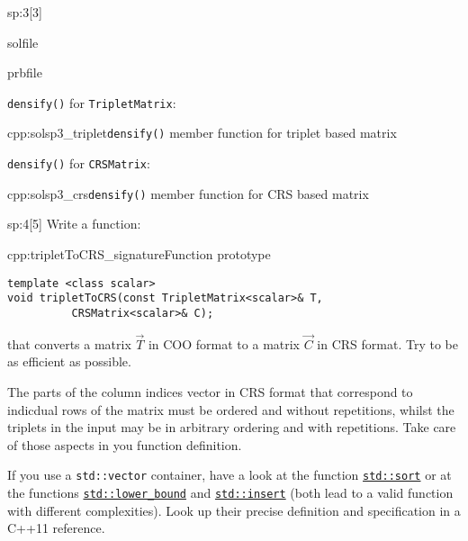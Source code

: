 \begin{samproblem}
\begin{subproblem}{sp:3}[3]
  \begin{samwriteprbpart}{solfile}
    \begin{writeverbatim}{prbfile}
      \begin{samsolution}
			\texttt{densify()} for \texttt{TripletMatrix}:
			\begin{samcode}[C++-code]{cpp:solsp3_triplet}{\texttt{densify()} member function for triplet based matrix}
			\end{samcode}
			\texttt{densify()} for \texttt{CRSMatrix}:
			\begin{samcode}[C++-code]{cpp:solsp3_crs}{\texttt{densify()} member function for CRS based matrix}
			\end{samcode}
      \end{samsolution}
    \end{writeverbatim}
  \end{samwriteprbpart}

\end{subproblem}

\begin{subproblem}{sp:4}[5]
  Write a function:
	\begin{samcode}[C++-code]{cpp:tripletToCRS_signature}{Function prototype}
		\begin{lstlisting}[style=cpp]
template <class scalar>
void tripletToCRS(const TripletMatrix<scalar>& T,
		  CRSMatrix<scalar>& C);
		\end{lstlisting}
	\end{samcode}
  that converts a matrix $\vec{T}$ in COO format to a matrix $\vec{C}$ in CRS format. 
	Try to be as efficient as possible.
  
  \begin{samhint}
    The parts of the column indices vector in CRS format that correspond to
    indicdual rows of the matrix must be ordered and without repetitions, whilst
    the triplets in the input may be in arbitrary ordering and with
    repetitions. Take care of those aspects in you function definition.
  \end{samhint}
  
  \begin{samhint}
    If you use a \verb|std::vector| container, have a look at the function
    \href{http://www.cplusplus.com/reference/algorithm/sort/}{\texttt{std::sort}}
    or at the functions
    \href{http://www.cplusplus.com/reference/algorithm/lower_bound/}{\texttt{std::lower\_bound}}
    and
    \href{http://www.cplusplus.com/reference/vector/vector/insert/}{\texttt{std::insert}}
    (both lead to a valid function with different complexities). Look up their
    precise definition and specification in a C++11 reference. 
  \end{samhint}
  

\end{subproblem}
\end{samproblem}
